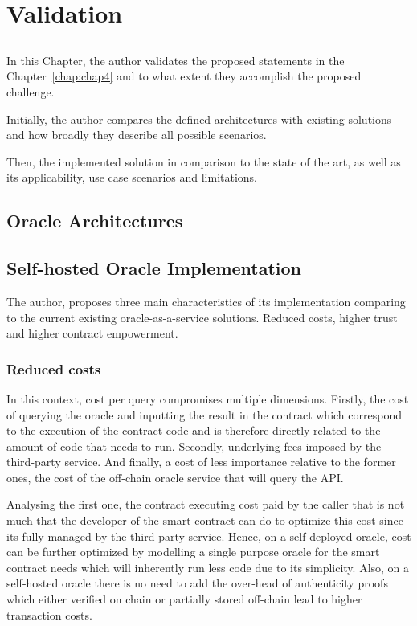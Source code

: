 \chapter{Validation} \label{chap:chap7}

\section*{}
In this Chapter, the author validates the proposed statements in the Chapter~\ref{chap:chap4} and to what extent they accomplish the proposed challenge.

Initially, the author compares the defined architectures with existing solutions and how broadly they describe all possible scenarios.

Then, the implemented solution in comparison to the state of the art, as well as its applicability, use case scenarios and limitations.


\section{Oracle Architectures}


\section{Self-hosted Oracle Implementation}

The author, proposes three main characteristics of its implementation comparing to the current existing oracle-as-a-service solutions. Reduced costs, higher trust and higher contract empowerment.


\subsection{Reduced costs}

In this context, cost per query compromises multiple dimensions. Firstly, the cost of querying the oracle and inputting the result in the contract which correspond to the execution of the contract code and is therefore directly related to the amount of code that needs to run. Secondly, underlying fees imposed by the third-party service. And finally, a cost of less importance relative to the former ones, the cost of the off-chain oracle service that will query the API.

Analysing the first one, the contract executing cost paid by the caller that is not much that the developer of the smart contract can do to optimize this cost since its fully managed by the third-party service. Hence, on a self-deployed oracle, cost can be further optimized by modelling a single purpose oracle for the smart contract needs which will inherently run less code due to its simplicity. Also, on a self-hosted oracle there is no need to add the over-head of authenticity proofs which either verified on chain or partially stored off-chain lead to higher transaction costs.

